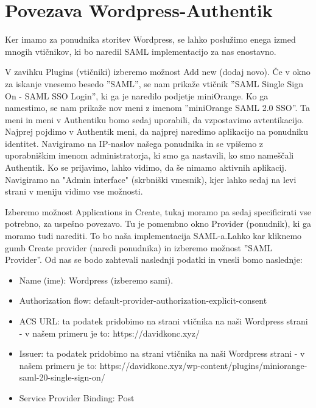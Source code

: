\documentclass[a4paper,12pt,openright]{book}
\begin{document}
\section{Povezava Wordpress-Authentik}
\label{authwp}

Ker imamo za ponudnika storitev Wordpress, se lahko poslužimo enega izmed mnogih vtičnikov, ki bo naredil SAML implementacijo za nas enostavno.  

V zavihku Plugins (vtičniki) izberemo možnost Add new (dodaj novo). Če v okno za iskanje vnesemo besedo ''SAML'', se nam prikaže vtičnik  ''SAML Single Sign On - SAML SSO Login'', ki ga je naredilo podjetje miniOrange\cite{miniOrange}. 
\newline
Ko ga namestimo, se nam prikaže nov meni z imenom ''miniOrange SAML 2.0 SSO''. Ta meni in meni v Authentiku bomo sedaj uporabili, da vzpostavimo avtentikacijo. 
\newline
Najprej pojdimo v Authentik meni, da najprej naredimo aplikacijo na ponudniku identitet. Navigiramo na IP-naslov našega ponudnika in se vpišemo z uporabniškim imenom administratorja, ki smo ga nastavili, ko smo nameščali Authentik. Ko se prijavimo, lahko vidimo, da še nimamo aktivnih aplikacij. Navigiramo na "Admin interface" (skrbniški vmesnik), kjer lahko sedaj na levi strani v meniju vidimo vse možnosti.

Izberemo možnost Applications in Create, tukaj moramo pa sedaj specificirati vse potrebno, za uspešno povezavo. Tu je pomembno okno Provider (ponudnik), ki ga moramo tudi narediti. To bo naša implementacija SAML-a.Lahko kar kliknemo gumb Create provider (naredi ponudnika) in izberemo možnost ''SAML Provider''. 
Od nas se bodo zahtevali naslednji podatki in vnesli bomo naslednje:
\begin{itemize}
    \item Name (ime): Wordpress (izberemo sami).
    \item Authorization flow: default-provider-authorization-explicit-consent
    \item ACS URL: ta podatek pridobimo na strani vtičnika na naši Wordpress strani - v našem primeru je to: https://davidkonc.xyz/
    \item Issuer: ta podatek pridobimo na strani vtičnika na naši Wordpress strani - v našem primeru je to: https://davidkonc.xyz/wp-content/plugins/miniorange-saml-20-single-sign-on/
    \item Service Provider Binding:  Post
\end{itemize}
\end{document}
